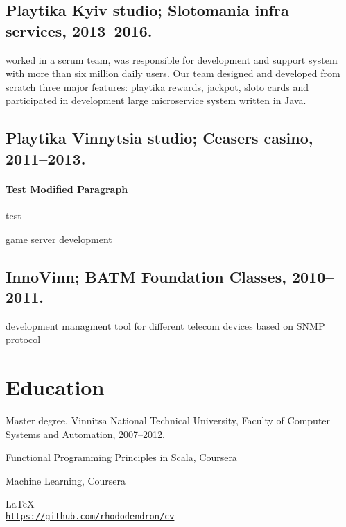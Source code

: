 \documentclass[letterpaper]{article}
\def\footerlink{https://github.com/rhododendron/cv}
\renewenvironment{itemize}{
  \begin{list}{}{
    \setlength{\leftmargin}{1.5em}
  }
}{
  \end{list}
}
\begin{document}
\subsection*{Playtika Kyiv studio; Slotomania infra services, 2013--2016.}

\begin{itemize}
\item worked in a scrum team, was responsible for development and support system with more than six million daily users. Our team designed and developed from scratch three major features: playtika rewards, jackpot, sloto cards and participated in development large microservice system written in Java.  
\end{itemize}

\subsection*{Playtika Vinnytsia studio; Ceasers casino, 2011--2013.}
\paragraph{Test Modified Paragraph}
test
\begin{itemize}
\item game server development
\end{itemize}

\subsection*{InnoVinn; BATM Foundation Classes, 2010--2011.}

\begin{itemize}
\item development managment tool for different telecom devices based on SNMP protocol
\end{itemize}

\section*{Education}

\begin{itemize}
  \item Master degree, Vinnitsa National Technical University, Faculty of Computer 
Systems and Automation, 2007--2012.
  \item Functional Programming Principles in Scala, Coursera
  \item Machine Learning, Coursera
\end{itemize}

\bigskip

\begin{center}
  \begin{footnotesize}
    \LaTeX \\
    \href{\footerlink}{\texttt{\footerlink}}
  \end{footnotesize}
\end{center}
\end{document}
